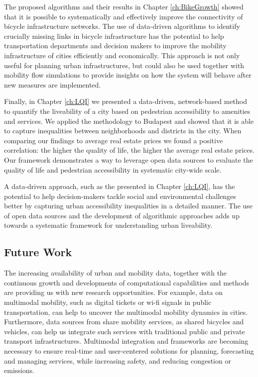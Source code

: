 The proposed algorithms and their results in Chapter \ref{ch:BikeGrowth} showed that it is possible to systematically and effectively improve the connectivity of bicycle infrastructure networks. The use of data-driven algorithms to identify crucially missing links in bicycle infrastructure has the potential to help transportation departments and decision makers to improve the mobility infrastructure of cities efficiently and economically. This approach is not only useful for planning urban infrastructures, but could also be used together with  mobility flow simulations to provide insights on how the system will behave after new measures are implemented.

Finally, in Chapter \ref{ch:LQI} we presented a data-driven, network-based method to quantify the liveability of a city based on pedestrian accessibility to amenities and services. We applied the methodology to Budapest and showed that it is able to capture inequalities between neighborhoods and districts in the city. When comparing our findings to average real estate prices we found a positive correlation: the higher the quality of life, the higher the average real estate prices. Our framework demonstrates a way to leverage open data sources to evaluate the quality of life and pedestrian accessibility in systematic city-wide scale.

A data-driven approach, such as the presented in Chapter \ref{ch:LQI}, has the potential to help decision-makers tackle social and environmental challenges better by capturing urban accessibility inequalities in a detailed manner. The use of open data sources and the development of algorithmic approaches adds up towards a systematic framework for understanding urban liveability.
 

\subsection*{Future Work}

The increasing availability of urban and mobility data, together with the continuous growth and developments of computational capabilities and methods are providing us with new research opportunities. For example, data on multimodal mobility, such as digital tickets or wi-fi signals in public transportation, can help to uncover the multimodal mobility dynamics in cities. Furthermore, data sources from share mobility services, as shared bicycles and vehicles, can help us integrate such services with traditional public and private transport infrastructures. Multimodal integration and frameworks are becoming necessary to ensure real-time and user-centered solutions for planning, forecasting and managing services, while increasing safety, and reducing congestion or emissions.

